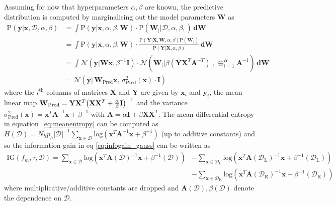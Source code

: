 	Assuming for now that hyperparameters $\alpha, \beta$ are known, the predictive distribution is computed by marginalising out the model parameters $\mathbf{W}$ as
	\begin{align}
	\text{P}(\mathbf{y}|\mathbf{x}, \mathcal{D},\alpha,\beta ) 
	& = \int \text{P}(\mathbf{y}|\mathbf{x},\alpha,\beta,\mathbf{W}) \cdot \text{P}(\mathbf{W}_{|}|\mathcal{D},\alpha,\beta,) \,\mathbf{dW}\\
	& = \int \text{P}(\mathbf{y}|\mathbf{x},\alpha,\beta,\mathbf{W}) \cdot \frac{\text{P}(\mathbf{Y}|\mathbf{X},\mathbf{W},\alpha,\beta)\text{P}(\mathbf{W}_{|})}{\text{P}(\mathbf{Y}|\mathbf{X},\alpha,\beta)} \,\mathbf{dW}\\
	& = \int \mathcal{N}(\mathbf{y}| \mathbf{W}\mathbf{x},\beta^{-1}\mathbf{I}) \cdot \mathcal{N}(\mathbf{W}_{|}| \beta(\mathbf{YX}^{T}\mathbf{A}^{-T})_{|},\,\oplus_{i=1}^H \mathbf{A}^{-1})\,\mathbf{dW}\\
	&=  \mathcal{N}(\mathbf{y}| \,\mathbf{W}_{\text{Pred}}\mathbf{x},\, \sigma_{\text{Pred}}^2(\mathbf{x})\cdot \mathbf{I} ) \label{eq:baypredictive}
	\end{align}
	where the $i^{\text{th}}$ columns of matrices $\mathbf{X}$ and $\mathbf{Y}$ are given by $\textbf{x}_i$ and $\textbf{y}_i$, the mean linear map $\mathbf{W}_{\text{Pred}} = \mathbf{Y}\mathbf{X}^T\big{(}\mathbf{X}\mathbf{X}^T+\frac{\alpha}{\beta}\mathbf{I}\big{)}^{-1}$ and the variance $\sigma_{\text{Pred}}^2(\mathbf{x}) = \mathbf{x}^{T}\mathbf{A}^{-1}\mathbf{x}+\beta^{-1}$ with $\mathbf{A} = \alpha\mathbf{I}+\beta \mathbf{X}\mathbf{X}^{T}$. The mean differential entropy in equation~\eqref{eq:meanentropy} can be computed as $H(\mathcal{D}) = N_hp_h|\mathcal{D}|^{-1}\sum_{\mathbf{x} \in \mathcal{D}}\text{log}(\mathbf{x}^{T}\mathbf{A}^{-1}\mathbf{x}+\beta^{-1})$ (up to additive constants) and so the information gain in eq \ref{eq:infogain_gauss} can be written as 
	\begin{align*}
	\text{IG}(f_m,\tau,\mathcal{D}) = \sum_{\mathbf{x} \in \mathcal{D}}\text{log}(\mathbf{x}^{T}\mathbf{A}(\mathcal{D})^{-1}\mathbf{x}+\beta^{-1}(\mathcal{D})) & - \sum_{\mathbf{x}\in\mathcal{D}_{\text{L}}}\text{log}(\mathbf{x}^{T}\mathbf{A}(\mathcal{D}_{\text{L}})^{-1}\mathbf{x}+\beta^{-1}(\mathcal{D}_{\text{L}})) 
	\\&- \sum_{\mathbf{x} \in \mathcal{D}_{\text{R}}}\text{log}(\mathbf{x}^{T}\mathbf{A}(\mathcal{D}_{\text{R}})^{-1}\mathbf{x}+\beta^{-1}(\mathcal{D}_{\text{R}}))
	\end{align*}
	where multiplicative/additive constants are dropped and $\mathbf{A}(\mathcal{D}), \beta(\mathcal{D})$ denote the dependence on $\mathcal{D}$. 
	
